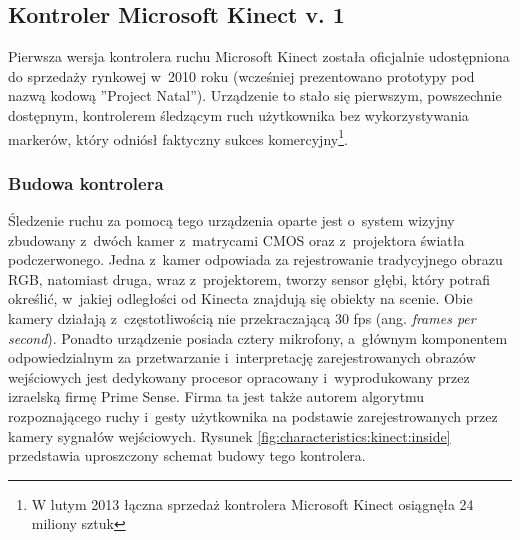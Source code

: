 \subsection{Kontroler Microsoft Kinect v. 1}\label{sec:characteristics:kinect}
Pierwsza wersja kontrolera ruchu Microsoft Kinect została oficjalnie udostępniona do sprzedaży rynkowej w~2010 roku (wcześniej prezentowano prototypy pod nazwą kodową ''Project Natal''). Urządzenie to stało się pierwszym, powszechnie dostępnym, kontrolerem śledzącym ruch użytkownika bez wykorzystywania markerów, który odniósł faktyczny sukces komercyjny\footnote{W lutym 2013 łączna sprzedaż kontrolera Microsoft Kinect osiągnęła 24 miliony sztuk }.  
																													
\subsubsection*{Budowa kontrolera}
Śledzenie ruchu za pomocą tego urządzenia oparte jest o~system wizyjny zbudowany z~dwóch kamer z~matrycami CMOS oraz z~projektora światła podczerwonego. Jedna z~kamer odpowiada za rejestrowanie tradycyjnego obrazu RGB, natomiast druga, wraz z~projektorem, tworzy sensor głębi, który potrafi określić, w~jakiej odległości od Kinecta znajdują się obiekty na scenie. Obie kamery działają z~częstotliwością nie przekraczającą 30 fps (ang. \textsl{frames per second}). Ponadto urządzenie posiada cztery mikrofony, a~głównym komponentem odpowiedzialnym za przetwarzanie i~interpretację zarejestrowanych obrazów wejściowych jest dedykowany procesor opracowany i~wyprodukowany przez izraelską firmę Prime Sense. Firma ta jest także autorem algorytmu rozpoznającego ruchy i~gesty użytkownika na podstawie zarejestrowanych przez kamery sygnałów wejściowych. Rysunek \ref{fig:characteristics:kinect:inside} przedstawia uproszczony schemat budowy tego kontrolera. 
																													
